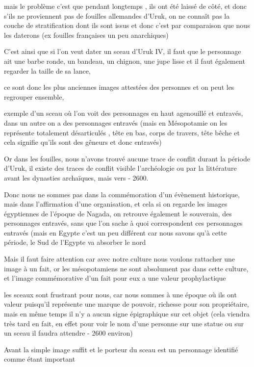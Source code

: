 \documentclass[a4paper,10pt]{article}
\begin{document}
\begin{itemize}
mais le problème c'est que pendant longtemps , ils ont
été laissé de côté, et donc s'ils ne proviennent pas
de fouilles allemandes d'Uruk, on ne connaît pas la
couche de stratification dont ils sont issus et donc
c'est par comparaison que nous les daterons (ex
fouilles françaises un peu anarchiques)

C'est ainsi que si l'on veut dater un
sceau d'Uruk IV, il faut que le personnage ait une
barbe ronde, un bandeau, un chignon, une jupe lisse et il faut
également regarder la taille de sa lance, 

ce sont donc les plus anciennes images attestées des personnes et on
peut les regrouper ensemble, 

exemple d'un sceau où  l'on voit des
personnages en haut agenouillé et entravés, dans un autre on a des
personnages entravés (mais en Mésopotamie on les représente totalement
désarticulés , tête en bas, corps de travers,  tête bêche et cela
signifie qu'ils sont des gêneurs et donc entravés)

Or dans les fouilles, nous n'avons trouvé aucune trace
de conflit durant la période d'Uruk, il existe des
traces de conflit visible l'archéologie ou par la
littérature avant les dynasties archaïques, mais vers - 2600.

\newline
Donc nous ne sommes pas dans la commémoration d'un
évènement historique, mais dans l'affirmation 
d'une organisation, et cela si on regarde les images
égyptiennes de l'époque de Nagada, on retrouve
également le souverain, des personnages entravés, sans que
l'on sache à quoi correspondent ces personnages
entravés (mais en Egypte c'est un peu différent car
nous savons qu'à cette période, le Sud de
l'Egypte va absorber le nord

Mais il faut faire attention car avec notre culture nous voulons
rattacher une image à un fait, or les mésopotamiens ne sont absolument
pas dans cette culture, et l'image commémorative
d'un fait pour eux a une valeur prophylactique

les sceaux sont frustrant pour nous, car nous sommes à une époque où ils
ont valeur puisqu'il représente une marque de pouvoir,
richesse pour son propriétaire, mais en même temps il
n'y a aucun signe épigraphique sur cet objet (cela
viendra très tard en fait, en effet pour voir le nom
d'une personne sur une statue ou sur un sceau il
faudra attendre - 2600 environ)

Avant la simple image suffit et le porteur du sceau est un personnage
identifié comme étant important


\end{itemize}
\end{document}
